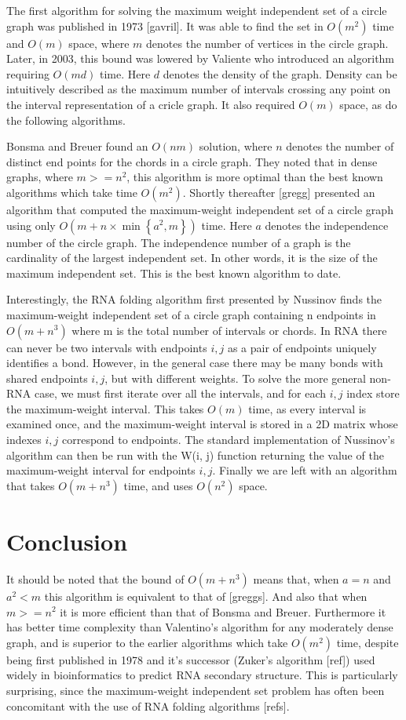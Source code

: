 \documentclass[12pt, a4paper]{article}
\begin{document}
The first algorithm for solving the maximum weight independent set of a circle graph was published in 1973 [gavril]. It was able to find the set in $O(m^2)$ time and $O(m)$ space, where $m$ denotes the number of vertices in the circle graph. Later, in 2003, this bound was lowered by Valiente who introduced an algorithm requiring $O(md)$ time. Here $d$ denotes the density of the graph. Density can be intuitively described as the maximum number of intervals crossing any point on the interval representation of a cricle graph.  It also required $O(m)$ space, as do the following algorithms.

Bonsma and Breuer found an $O(nm)$ solution, where $n$ denotes the number of distinct end points for the chords in a circle graph. They noted that in dense graphs, where $m >= n^2$, this algorithm is more optimal than the best known algorithms which take time $O(m^2)$. Shortly thereafter [gregg] presented an algorithm that computed the maximum-weight independent set of a circle graph using only $O(m + n\times \min \left\lbrace a^2, m\right\rbrace)$ time. Here $a$ denotes the independence number of the circle graph. The independence number of a graph is the cardinality of the largest independent set. In other words, it is the size of the maximum independent set. This is the best known algorithm to date.

Interestingly, the RNA folding algorithm first presented by Nussinov finds the maximum-weight independent set of a circle graph containing n endpoints in $O(m + n^3)$ where m is the total number of intervals or chords. In RNA there can never be two intervals with endpoints $i, j$ as a pair of endpoints uniquely identifies a bond. However, in the general case there may be many bonds with shared endpoints $i, j$, but with different weights. To solve the more general non-RNA case, we must first iterate over all the intervals, and for each $i, j$ index store the maximum-weight interval. This takes $O(m)$ time, as every interval is examined once, and the maximum-weight interval is stored in a 2D matrix whose indexes $i, j$ correspond to endpoints. The standard implementation of Nussinov’s algorithm can then be run with the W(i, j) function returning the value of the maximum-weight interval for endpoints $i, j$. Finally we are left with an algorithm that takes $O(m + n^3)$ time, and uses $O(n^2)$ space.


\section*{Conclusion}
It should be noted that the bound of $O(m + n^3)$ means that, when $a = n$ and $a^2 < m$ this algorithm is equivalent to that of [greggs]. And also that when $m >= n^2$ it is more efficient than that of Bonsma and Breuer. Furthermore it has better time complexity than Valentino's algorithm for any moderately dense graph, and is superior to the earlier algorithms which take $O(m^2)$ time, despite being first published in 1978 and it’s successor (Zuker’s algorithm [ref]) used widely in bioinformatics to predict RNA secondary structure. This is particularly surprising, since the maximum-weight independent set problem has often been concomitant with the use of RNA folding algorithms [refs].
\end{document}
